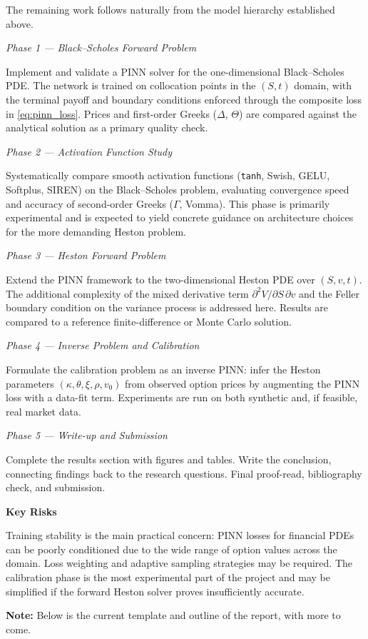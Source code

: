 The remaining work follows naturally from the model hierarchy established above.

\textit{Phase 1 --- Black--Scholes Forward Problem}

Implement and validate a PINN solver for the one-dimensional Black--Scholes PDE. The network is trained on collocation points in the $(S,t)$ domain, with the terminal payoff and boundary conditions enforced through the composite loss in \cref{eq:pinn_loss}. Prices and first-order Greeks ($\Delta$, $\Theta$) are compared against the analytical solution as a primary quality check.

\textit{Phase 2 --- Activation Function Study}

Systematically compare smooth activation functions (\texttt{tanh}, Swish, GELU, Softplus, SIREN) on the Black--Scholes problem, evaluating convergence speed and accuracy of second-order Greeks ($\Gamma$, Vomma). This phase is primarily experimental and is expected to yield concrete guidance on architecture choices for the more demanding Heston problem.

\textit{Phase 3 --- Heston Forward Problem}

Extend the PINN framework to the two-dimensional Heston PDE over $(S, v, t)$. The additional complexity of the mixed derivative term $\partial^2 V/\partial S\,\partial v$ and the Feller boundary condition on the variance process is addressed here. Results are compared to a reference finite-difference or Monte Carlo solution.

\textit{Phase 4 --- Inverse Problem and Calibration}

Formulate the calibration problem as an inverse PINN: infer the Heston parameters $(\kappa, \theta, \xi, \rho, v_0)$ from observed option prices by augmenting the PINN loss with a data-fit term. Experiments are run on both synthetic and, if feasible, real market data.

\textit{Phase 5 --- Write-up and Submission}

Complete the results section with figures and tables. Write the conclusion, connecting findings back to the research questions. Final proof-read, bibliography check, and submission.

\textbf{Key Risks}

Training stability is the main practical concern: PINN losses for financial PDEs can be poorly conditioned due to the wide range of option values across the domain. Loss weighting and adaptive sampling strategies may be required. The calibration phase is the most experimental part of the project and may be simplified if the forward Heston solver proves insufficiently accurate.

\textbf{Note:} Below is the current template and outline of the report, with more to come. 